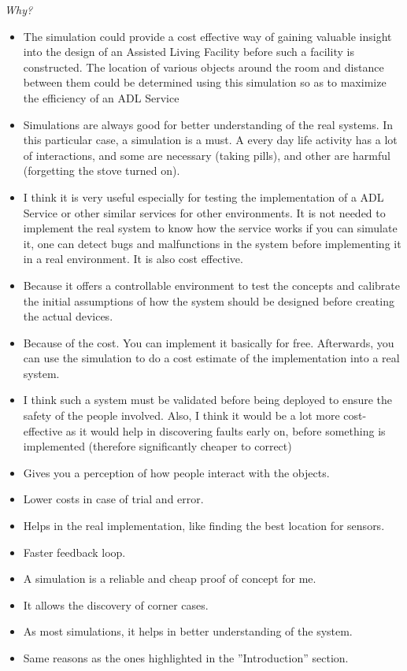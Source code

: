 \emph{Why?}
\begin{itemize}
	\item The simulation could provide a cost effective way of gaining valuable insight into the design of an Assisted Living Facility before such a facility is constructed. The location of various objects around the room and distance between them could be determined using this simulation so as to maximize the efficiency of an ADL Service
	\item Simulations are always good for better understanding of the real systems. In this particular case, a simulation is a must. A every day life activity has a lot of interactions, and some are necessary (taking pills), and other are harmful (forgetting the stove turned on).
	\item I think it is very useful especially for testing the implementation of a ADL Service or other similar services for other environments. It is not needed to implement the real system to know how the service works if you can simulate it, one can detect bugs and malfunctions in the system before implementing it in a real environment. It is also cost effective.
	\item Because it offers a controllable environment to test the concepts and calibrate the initial assumptions of how the system should be designed before creating the actual devices.
	\item Because of the cost. You can implement it basically for free. Afterwards, you can use the simulation to do a cost estimate of the implementation into a real system.
	\item I think such a system must be validated before being deployed to ensure the safety of the people involved. Also, I think it would be a lot more cost-effective as it would help in discovering faults early on, before something is implemented (therefore significantly cheaper to correct)
	\item Gives you a perception of how people interact with the objects.
	\item Lower costs in case of trial and error.
	\item Helps in the real implementation, like finding the best location for sensors.
	\item Faster feedback loop.
	\item A simulation is a reliable and cheap proof of concept for me.
	\item It allows the discovery of corner cases. 
	\item As most simulations, it helps in better understanding of the system.
	\item Same reasons as the ones highlighted in the ''Introduction'' section.
\end{itemize}

